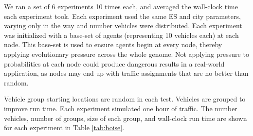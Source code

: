 \documentclass{sig-alternate-05-2015}
\begin{document}
We ran a set of 6 experiments 10 times each, and averaged the wall-clock
time each experiment took. Each experiment used the same ES and city 
parameters, varying only in the way and number vehicles were distributed. 
Each experiment was initialized with a base-set of agents (representing 10
vehicles each) at each node. This base-set is used to ensure agents
begin at every node, thereby applying evolutionary pressure across the 
whole genome. Not applying pressure to probabilities at each node
could produce dangerous results in a real-world application, as nodes
may end up with traffic assignments that are no better than random. 

Vehicle group starting locations are random in each test. 
Vehicles are grouped to improve run time. Each experiment simulated
one hour of traffic. The number vehicles, number of groups, size of 
each group, and wall-clock run time are shown for each experiment 
in Table \ref{tab:boise}.

\end{document}
